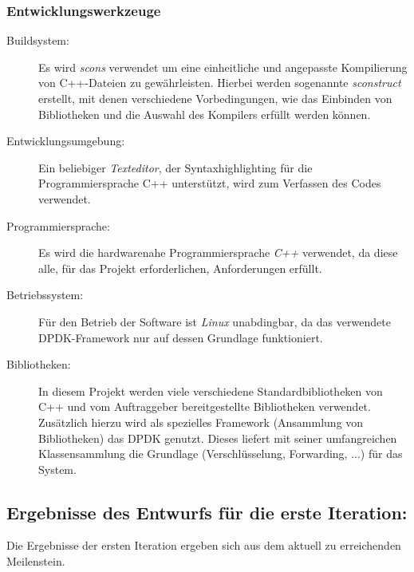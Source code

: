 \documentclass[a4paper, 11pt, ngerman, fleqn]{article}
\begin{document}
\subsubsection{Entwicklungswerkzeuge}
	\begin{description}
		\item[Buildsystem:] Es wird \textit{scons} verwendet um eine einheitliche und angepasste Kompilierung von C++-Dateien zu gewährleisten. 
		Hierbei werden sogenannte \textit{sconstruct} erstellt, mit denen verschiedene Vorbedingungen, wie das Einbinden von Bibliotheken und die Auswahl des Kompilers erfüllt werden können.
		
		\item[Entwicklungsumgebung:] Ein beliebiger \textit{Texteditor}, der Syntaxhighlighting für die Programmiersprache C++ unterstützt, wird zum Verfassen des Codes verwendet.
		
		\item[Programmiersprache:] Es wird die hardwarenahe Programmiersprache \textit{C++} verwendet, da diese alle, für das Projekt erforderlichen, Anforderungen erfüllt.
		
		\item[Betriebssystem:] Für den Betrieb der Software ist \textit{Linux} unabdingbar, da das verwendete DPDK-Framework nur auf dessen Grundlage funktioniert.
		
		\item[Bibliotheken:] In diesem Projekt werden viele verschiedene Standardbibliotheken von C++ und vom Auftraggeber bereitgestellte Bibliotheken verwendet. 
		Zusätzlich hierzu wird als spezielles Framework (Ansammlung von Bibliotheken) das DPDK genutzt. 
		Dieses liefert mit seiner umfangreichen Klassensammlung die Grundlage (Verschlüsselung, Forwarding, ...) für das System. 
		
	\end{description}

\subsection{Ergebnisse des Entwurfs für die erste Iteration:}
Die Ergebnisse der ersten Iteration ergeben sich aus dem aktuell zu erreichenden Meilenstein.
\end{document}
